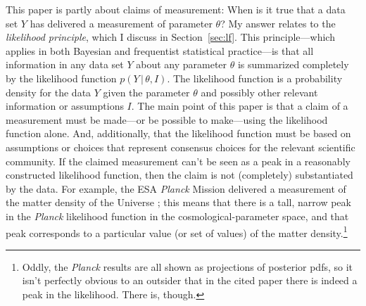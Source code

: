\documentclass{article}
\newcommand{\sectionname}{Section}
\newcommand{\secref}[1]{\sectionname~\ref{#1}}
\newcommand{\given}{\,|\,}
\begin{document}
This paper is partly about claims of measurement:
When is it true that a data set $Y$ has delivered a measurement of parameter $\theta$?
My answer relates to the \emph{likelihood principle}, which I discuss in \secref{sec:lf}.
This principle---which applies in both Bayesian and frequentist statistical practice---is that all information in any data set $Y$ about any parameter $\theta$ is summarized completely by the likelihood function $p(Y\given\theta, I)$.
The likelihood function is a probability density for the data $Y$ given the parameter $\theta$ and possibly other relevant information or assumptions $I$.
The main point of this paper is that a claim of a measurement must be made---or be possible to make---using the likelihood function alone.
And, additionally, that the likelihood function must be based on assumptions or choices that represent consensus choices for the relevant scientific community.
If the claimed measurement can't be seen as a peak in a reasonably constructed likelihood function, then the claim is not (completely) substantiated by the data.
For example, the ESA \textsl{Planck} Mission \cite{Planck} delivered a measurement of the matter density of the Universe \cite{planck18};
this means that there is a tall, narrow peak in the \textsl{Planck} likelihood function in the cosmological-parameter space, and that peak corresponds to a particular value (or set of values) of the matter density.\footnote{Oddly, the \textsl{Planck} results are all shown as projections of posterior pdfs, so it isn't perfectly obvious to an outsider that in the cited paper \cite{planck18} there is indeed a peak in the likelihood. There is, though.}
\end{document}

